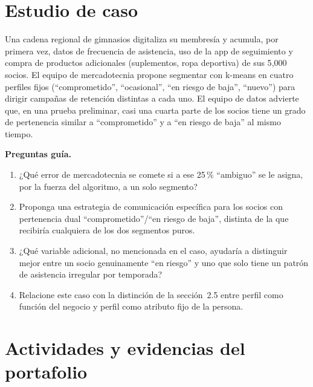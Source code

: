 \section{Estudio de caso}

\begin{casoFicticio}
Una cadena regional de gimnasios digitaliza su membresía y acumula, por
primera vez, datos de frecuencia de asistencia, uso de la app de
seguimiento y compra de productos adicionales (suplementos, ropa deportiva)
de sus 5{,}000 socios. El equipo de mercadotecnia propone segmentar con
k-means en cuatro perfiles fijos (\enquote{comprometido}, \enquote{ocasional},
\enquote{en riesgo de baja}, \enquote{nuevo}) para dirigir campañas de retención
distintas a cada uno. El equipo de datos advierte que, en una prueba
preliminar, casi una cuarta parte de los socios tiene un grado de
pertenencia similar a \enquote{comprometido} y a \enquote{en riesgo de baja} al
mismo tiempo.

\textbf{Preguntas guía.}
\begin{enumerate}
  \item ¿Qué error de mercadotecnia se comete si a ese 25\,\% \enquote{ambiguo}
  se le asigna, por la fuerza del algoritmo, a un solo segmento?
  \item Proponga una estrategia de comunicación específica para los socios
  con pertenencia dual \enquote{comprometido}/\enquote{en riesgo de baja}, distinta
  de la que recibiría cualquiera de los dos segmentos puros.
  \item ¿Qué variable adicional, no mencionada en el caso, ayudaría a
  distinguir mejor entre un socio genuinamente \enquote{en riesgo} y uno que
  solo tiene un patrón de asistencia irregular por temporada?
  \item Relacione este caso con la distinción de la sección~2.5 entre perfil
  como función del negocio y perfil como atributo fijo de la persona.
\end{enumerate}
\end{casoFicticio}

\section{Actividades y evidencias del portafolio}

